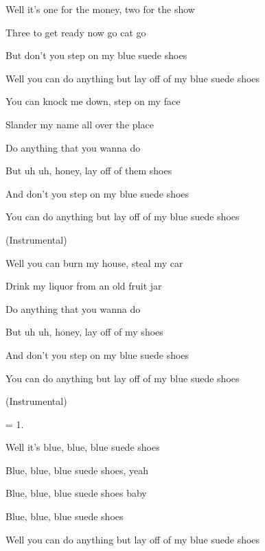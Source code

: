 
\zs
Well it's one for the money, two for the show

Three to get ready now go cat go

But don't you step on my blue suede shoes

Well you can do anything but lay off of my blue suede shoes
\ks

\zs
You can knock me down, step on my face

Slander my name all over the place

Do anything that you wanna do

But uh uh, honey, lay off of them shoes

And don't you step on my blue suede shoes

You can do anything but lay off of my blue suede shoes
\ks

\zs
(Instrumental)
\ks

\zs
Well you can burn my house, steal my car

Drink my liquor from an old fruit jar

Do anything that you wanna do

But uh uh, honey, lay off of my shoes

And don't you step on my blue suede shoes

You can do anything but lay off of my blue suede shoes
\ks

\zs
(Instrumental)
\ks

\zs
= 1.
\ks

\zs
Well it's blue, blue, blue suede shoes

Blue, blue, blue suede shoes, yeah

Blue, blue, blue suede shoes baby

Blue, blue, blue suede shoes

Well you can do anything but lay off of my blue suede shoes
\ks

\kp
